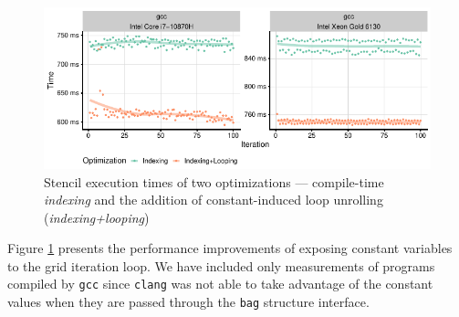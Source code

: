 \begin{figure}[H]
  \vspace{-10pt}
	\centering
	\includegraphics{noarr/plots/stencil_loop.pdf}
	\caption{Stencil execution times of two optimizations --- compile-time \emph{indexing} and the addition of constant-induced loop unrolling (\emph{indexing+looping})}
	\label{fig:stencil_wloop}
  \vspace{-10pt}
\end{figure}

Figure \ref{fig:stencil_wloop} presents the performance improvements of exposing constant variables to the grid iteration loop. We have included only measurements of programs compiled by \texttt{gcc} since \texttt{clang} was not able to take advantage of the constant values when they are passed through the \texttt{bag} structure interface.
